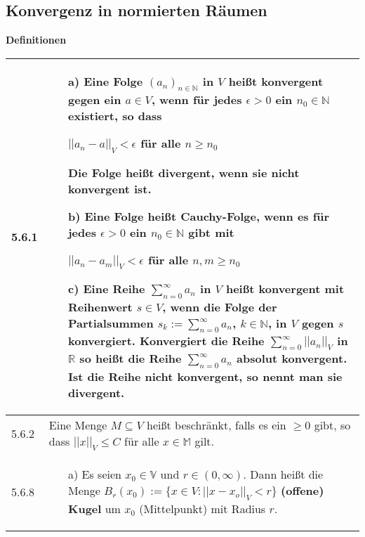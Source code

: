 \subsection{Konvergenz in normierten Räumen}

\noindent
\textbf{Definitionen}
\begin{table}[H]  
\begin{tabularx}{\textwidth}{X m{16cm}}
    \toprule

    5.6.1 & \begin{itemize}
                \item[a)] Eine Folge $(a_n)_{n \in \mathbb{N}}$ in $V$ heißt \textbf{konvergent} gegen ein $a \in V$, wenn
                            für jedes $\epsilon > 0$ ein $n_0 \in \mathbb{N}$ existiert, so dass \hfill \break
                            \centerline{$||a_n - a||_V < \epsilon$ für alle $n \geq n_0$}
                            Die Folge heißt \textbf{divergent,} wenn sie nicht konvergent ist.
                \item[b)] Eine Folge heißt \textbf{Cauchy-Folge}, wenn es für jedes $\epsilon > 0$ ein $n_0 \in \mathbb{N}$ gibt
                            mit \hfill \break
                            \centerline{$||a_n - a_m||_V < \epsilon$ für alle $n,m \geq n_0$}
                \item[c)] Eine Reihe $\sum^{\infty}_{n=0} a_n$ in $V$ heißt \textbf{konvergent} mit Reihenwert $s \in V$, wenn die
                            Folge der Partialsummen $s_k := \sum^{\infty}_{n=0} a_n$, $k \in \mathbb{N}$, in $V$ gegen $s$ konvergiert. \hfill \break
                            Konvergiert die Reihe $\sum^{\infty}_{n=0} ||a_n||_V$ in $\mathbb{R}$ so heißt die Reihe
                            $\sum^{\infty}_{n=0}a_n$ \textbf{absolut konvergent}. \hfill \break
                            Ist die Reihe nicht konvergent, so nennt man sie \textbf{divergent}.
            \end{itemize} \\
    \midrule
    5.6.2 & Eine Menge $M \subseteq V$ hei\ss t beschränkt, falls es ein $ \geq 0$ gibt, so dass $||x||_V \leq C$ für alle 
            $x \in \mathbb{M}$ gilt. \\
    \midrule
    5.6.8 & \begin{itemize}
                \item[a)] Es seien $x_0 \in \mathbb{V}$ und $r \in (0, \infty)$. Dann heißt die Menge \hfill \break
                            $B_r(x_0) := \{x \in V: ||x-x_o||_V < r\} $ \textbf{(offene) Kugel} um $x_0$ (Mittelpunkt) mit Radius $r$.

\end{itemize}
\end{tabularx}
\end{table}
